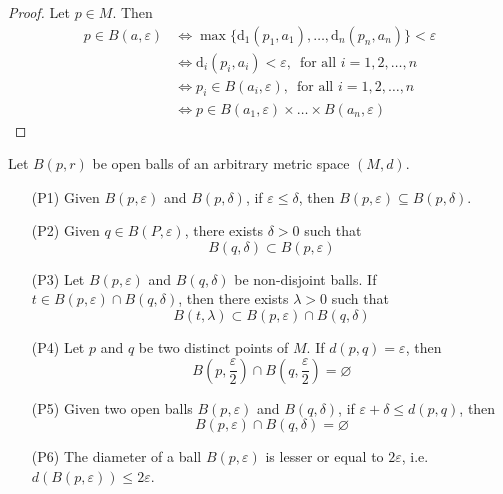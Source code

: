 \begin{proof}
	Let $p \in M$. Then
	\begin{equation*}
		\begin{aligned}
			p \in B(a, \varepsilon) &\iff \max \{ \mathrm{d}_1(p_1, a_1), \ldots, \mathrm{d}_n(p_n, a_n) \} < \varepsilon \\
			&\iff \mathrm{d}_i(p_i, a_i) < \varepsilon, \, \text{ for all } i = 1, 2, \ldots, n \\
			&\iff p_i \in B(a_i, \varepsilon), \, \text{ for all } i = 1, 2, \ldots, n \\
			&\iff p \in B(a_1, \varepsilon) \times \ldots \times B(a_n, \varepsilon)
		\end{aligned}
	\end{equation*}
\end{proof}

\begin{theorem}
	Let $B(p, r)$ be open balls of an arbitrary metric space $(M, d)$.
	\begin{itemize}
		\item[(P1)] Given $B(p, \varepsilon)$ and $B(p, \delta)$, if $\varepsilon \leq \delta$, then $B(p, \varepsilon) \subseteq B(p, \delta)$.
		\item[(P2)] Given $q \in B(P, \varepsilon)$, there exists $\delta > 0$ such that \[ B(q, \delta) \subset B(p, \varepsilon) \]
		\item[(P3)] Let $B(p, \varepsilon)$ and $B(q, \delta)$ be non-disjoint balls. If $t \in B(p, \varepsilon) \cap B(q, \delta) $, then there exists $\lambda > 0$ such that \[ B(t, \lambda) \subset B(p, \varepsilon) \cap B(q, \delta) \]
		\item[(P4)] Let $p$ and $q$ be two distinct points of $M$. If $d(p,q) = \varepsilon$, then \[ B \left( p, \frac{\varepsilon}{2} \right) \cap B \left( q, \frac{\varepsilon}{2} \right) = \varnothing \]
		\item[(P5)] Given two open balls $B(p, \varepsilon)$ and $B(q, \delta)$, if $\varepsilon + \delta \leq d(p,q)$, then \[ B(p, \varepsilon) \cap B(q, \delta) = \varnothing \]
		\item[(P6)] The diameter of a ball $B(p, \varepsilon)$ is lesser or equal to $2 \varepsilon$, i.e. $d(B(p, \varepsilon))  \leq 2 \varepsilon$.
	\end{itemize}
\end{theorem}

